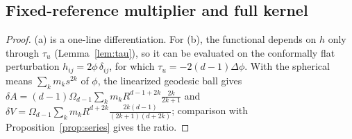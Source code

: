 \documentclass[12pt]{article}
\theoremstyle{definition}
\theoremstyle{remark}
\begin{document}
\subsection{Fixed-reference multiplier and full kernel}
\label{app:prop:lambda}
\begin{proof}
(a) is a one-line differentiation. For (b), the functional depends on \(h\) only through
\(\tau_u\) (Lemma~\ref{lem:tau}), so it can be evaluated on the conformally flat
perturbation \(h_{ij}=2\phi\,\delta_{ij}\), for which \(\tau_u=-2(d-1)\Delta\phi\). With the
spherical means \(\sum_km_ks^{2k}\) of \(\phi\), the linearized geodesic ball gives
\(\delta A=(d-1)\Omega_{d-1}\sum_km_kR^{d-1+2k}\frac{2k}{2k+1}\) and
\(\delta V=\Omega_{d-1}\sum_km_kR^{d+2k}\frac{2k(d-1)}{(2k+1)(d+2k)}\); comparison with
Proposition~\ref{prop:series} gives the ratio.
\end{proof}
\end{document}
